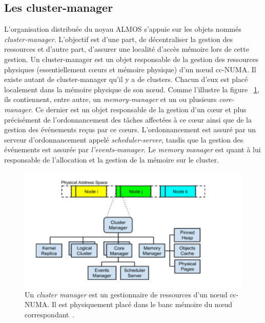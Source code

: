     
    \subsection{Les cluster-manager}

      L'organisation distribuée du noyau ALMOS s’appuie sur les objets nommés
      \textit{cluster-manager}. L’objectif est d’une part, de décentraliser la
      gestion des ressources et d’autre part, d’assurer une localité d’accès
      mémoire lors de cette gestion. Un cluster-manager est un objet responsable
      de la gestion des ressources physiques (essentiellement c\oe urs et
      mémoire physique) d’un nœud cc-NUMA. Il existe autant de cluster-manager
      qu’il y a de clusters. Chacun d'eux est placé localement dans la mémoire
      physique de son n\oe ud. Comme l'illustre la figure
      ~\ref{fig:cluster_manager}, ils contiennent, entre autre, un
      \textit{memory-manager} et un ou plusieurs \textit{core-manager}.  Ce
      dernier est un objet responsable de la gestion d’un c\oe ur et plus
      précisément de l'ordonnancement des tâches affectées à ce c\oe ur ainsi
      que de la gestion des événements reçus par ce c\oe urs. L'ordonnancement
      est assuré par un serveur d'ordonnancement appelé
      \textit{scheduler-server}, tandis que la gestion des événements est
      assurée par \textit{l'events-manager}. Le \textit{memory manager} est
      quant à lui responsable de l'allocation et la gestion de la mémoire sur le
      cluster.

      \begin{figure}[ht]
        \centering \includegraphics[scale=0.22]{include/img/cluster_manager}
        \caption{Un \textit{cluster manager} est un gestionnaire de ressources
          d'un n\oe ud cc-NUMA. Il est physiquement placé dans le banc mémoire
          du n\oe ud correspondant~\citep{almaless2014universite}.}
        \label{fig:cluster_manager}
      \end{figure}

